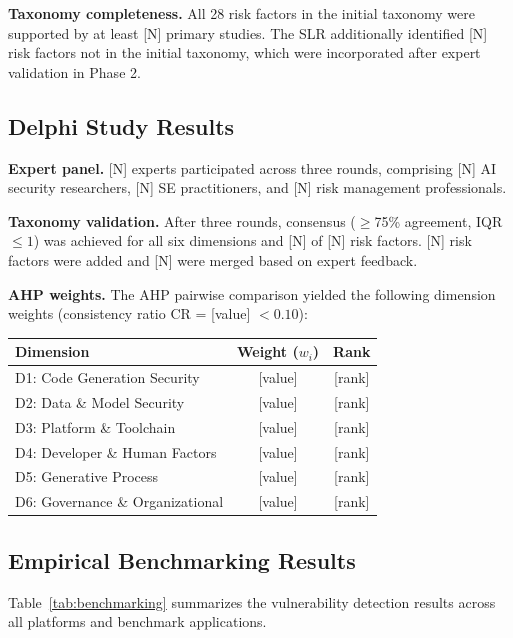 \documentclass[preprint,review,12pt]{elsarticle}
\begin{document}
\textbf{Taxonomy completeness.} All 28 risk factors in the initial taxonomy were supported by at least [N] primary studies. The SLR additionally identified [N] risk factors not in the initial taxonomy, which were incorporated after expert validation in Phase 2.


\subsection{Delphi Study Results}
\label{subsec:delphi_results}

\textbf{Expert panel.} [N] experts participated across three rounds, comprising [N] AI security researchers, [N] SE practitioners, and [N] risk management professionals.

\textbf{Taxonomy validation.} After three rounds, consensus ($\geq$75\% agreement, IQR $\leq 1$) was achieved for all six dimensions and [N] of [N] risk factors. [N] risk factors were added and [N] were merged based on expert feedback.

\textbf{AHP weights.} The AHP pairwise comparison yielded the following dimension weights (consistency ratio CR = [value] $< 0.10$):

\begin{center}
\begin{tabular}{l c c}
\toprule
\textbf{Dimension} & \textbf{Weight ($w_i$)} & \textbf{Rank} \\
\midrule
D1: Code Generation Security & [value] & [rank] \\
D2: Data \& Model Security & [value] & [rank] \\
D3: Platform \& Toolchain & [value] & [rank] \\
D4: Developer \& Human Factors & [value] & [rank] \\
D5: Generative Process & [value] & [rank] \\
D6: Governance \& Organizational & [value] & [rank] \\
\bottomrule
\end{tabular}
\end{center}


\subsection{Empirical Benchmarking Results}
\label{subsec:benchmarking_results}

Table~\ref{tab:benchmarking} summarizes the vulnerability detection results across all platforms and benchmark applications.
\end{document}
